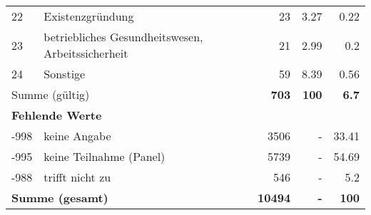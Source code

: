 \begin{longtable}{lXrrr}
        22 & \multicolumn{1}{X}{Existenzgründung} & %
          \num{23} &
          \num[round-mode=places,round-precision=2]{3,27} &
          \num[round-mode=places,round-precision=2]{0,22} \\

        23 & \multicolumn{1}{X}{betriebliches Gesundheitswesen, Arbeitssicherheit} & %
          \num{21} &
          \num[round-mode=places,round-precision=2]{2,99} &
          \num[round-mode=places,round-precision=2]{0,2} \\

        24 & \multicolumn{1}{X}{Sonstige} & %
          \num{59} &
          \num[round-mode=places,round-precision=2]{8,39} &
          \num[round-mode=places,round-precision=2]{0,56} \\

     \midrule
     \multicolumn{2}{l}{Summe (gültig)} &
       \textbf{\num{703}} &
     \textbf{100} &
       \textbf{\num[round-mode=places,round-precision=2]{6,7}} \\
     \multicolumn{5}{l}{\textbf{Fehlende Werte}}\\
       -998 &
       keine Angabe &
         \num{3506} &
        - &
         \num[round-mode=places,round-precision=2]{33,41} \\
       -995 &
       keine Teilnahme (Panel) &
         \num{5739} &
        - &
         \num[round-mode=places,round-precision=2]{54,69} \\
       -988 &
       trifft nicht zu &
         \num{546} &
        - &
         \num[round-mode=places,round-precision=2]{5,2} \\
     \midrule
     \multicolumn{2}{l}{\textbf{Summe (gesamt)}} &
          \textbf{\num{10494}} &
        \textbf{-} &
        \textbf{100} \\
     \bottomrule
     \end{longtable}
     

